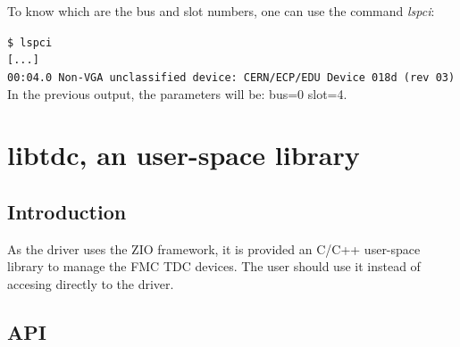\documentclass[a4paper,11pt]{article}
\begin{document}
To know which are the bus and slot numbers, one can use the command \textit{lspci}:

\indent\indent\texttt{\$ lspci} \\
\indent\indent\texttt{[...]} \\
\indent\indent\texttt{00:04.0 Non-VGA unclassified device: CERN/ECP/EDU Device 018d (rev 03)} \\
In the previous output, the parameters will be: bus=0 slot=4.


\section{libtdc, an user-space library}

\subsection{Introduction}

As the driver uses the ZIO framework, it is provided an C/C++ user-space library to manage the FMC TDC devices. The user should use it instead of accesing directly to the driver.

\subsection{API}
\end{document}
